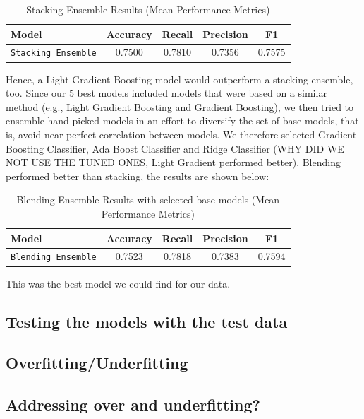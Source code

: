 \documentclass[a4paper,12pt]{article}
\begin{document}
\begin{table}[H]
    \centering
    \begin{tabular}{l c c c c}
    \toprule
    \textbf{Model} & \textbf{Accuracy} & \textbf{Recall} & \textbf{Precision} & \textbf{F1} \\
    \midrule
    \texttt{Stacking Ensemble} & 0.7500 & 0.7810 & 0.7356 & 0.7575 \\
    \bottomrule
    \end{tabular}
    \caption{Stacking Ensemble Results (Mean Performance Metrics)}
    \label{tab:stacking_performance}
\end{table}
    
Hence, a Light Gradient Boosting model would outperform a stacking ensemble, too.
Since our 5 best models included models that were based on a similar method (e.g., Light Gradient Boosting 
and Gradient Boosting), we then tried to ensemble hand-picked models in an effort to diversify the set of
base models, that is, avoid near-perfect correlation between models. We therefore selected Gradient Boosting Classifier, 
Ada Boost Classifier and Ridge Classifier (WHY DID WE NOT USE THE TUNED ONES, Light Gradient performed better).
Blending performed better than stacking, the results are shown below:

\begin{table}[H]
    \centering
    \begin{tabular}{l c c c c}
    \toprule
    \textbf{Model} & \textbf{Accuracy} & \textbf{Recall} & \textbf{Precision} & \textbf{F1} \\
    \midrule
    \texttt{Blending Ensemble} & 0.7523 & 0.7818 & 0.7383 & 0.7594 \\
    \bottomrule
    \end{tabular}
    \caption{Blending Ensemble Results with selected base models (Mean Performance Metrics)}
    \label{tab:blending_performance_handpicked}
\end{table}

This was the best model we could find for our data.


\subsection{Testing the models with the test data}
\subsection{Overfitting/Underfitting}
\subsection{Addressing over and underfitting?}
\end{document}

